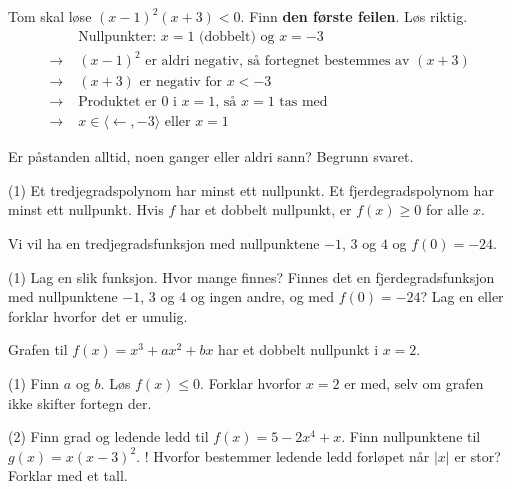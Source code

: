 Tom skal løse $(x - 1)^2(x + 3) < 0$. Finn \textbf{den første feilen}. Løs riktig.
\[ \begin{aligned}
&\text{Nullpunkter: } x = 1 \text{ (dobbelt) og } x = -3\\
\longrightarrow\;&(x-1)^2 \text{ er aldri negativ, så fortegnet bestemmes av } (x+3)\\
\longrightarrow\;&(x+3) \text{ er negativ for } x < -3\\
\longrightarrow\;&\text{Produktet er } 0 \text{ i } x = 1 \text{, så } x = 1 \text{ tas med}\\
\longrightarrow\;&x \in \langle \leftarrow, -3\rangle \text{ eller } x = 1
\end{aligned} \]


Er påstanden alltid, noen ganger eller aldri sann? Begrunn svaret.
\begin{tasks}(1)
  \task Et tredjegradspolynom har minst ett nullpunkt.
  \task Et fjerdegradspolynom har minst ett nullpunkt.
  \task Hvis $f$ har et dobbelt nullpunkt, er $f(x) \ge 0$ for alle $x$.
\end{tasks}

Vi vil ha en tredjegradsfunksjon med nullpunktene $-1$, $3$ og $4$ og $f(0) = -24$.
\begin{tasks}(1)
  \task Lag en slik funksjon. Hvor mange finnes?
  \task Finnes det en fjerdegradsfunksjon med nullpunktene $-1$, $3$ og $4$ og ingen andre, og med $f(0) = -24$? Lag en eller forklar hvorfor det er umulig.
\end{tasks}

Grafen til $f(x) = x^3 + ax^2 + bx$ har et dobbelt nullpunkt i $x = 2$.
\begin{tasks}(1)
  \task Finn $a$ og $b$.
  \task Løs $f(x) \le 0$. Forklar hvorfor $x = 2$ er med, selv om grafen ikke skifter fortegn der.
\end{tasks}

\begin{sjekk}
\begin{tasks}(2)
  \task Finn grad og ledende ledd til $f(x) = 5 - 2x^4 + x$.
  \task Finn nullpunktene til $g(x) = x(x - 3)^2$.
  \task! Hvorfor bestemmer ledende ledd forløpet når $|x|$ er stor? Forklar med et tall.
\end{tasks}
\end{sjekk}
